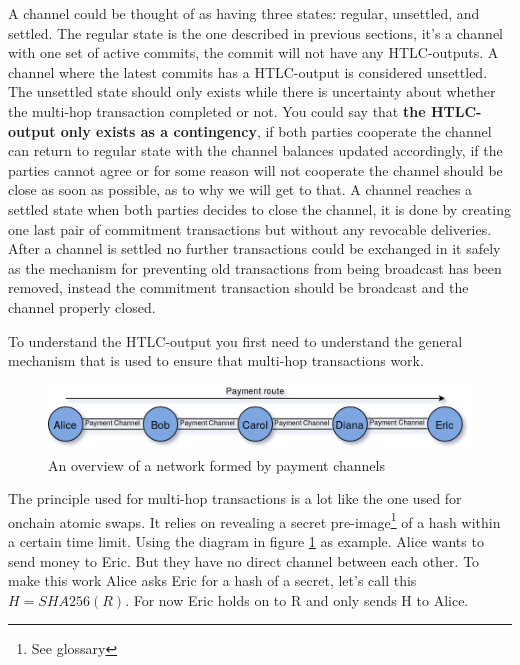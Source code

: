 A channel could be thought of as having three states: regular, unsettled, and settled. The regular state is the one described in previous sections, it's a channel with one set of active commits, the commit will not have any HTLC-outputs.\cite{lightningnetwork_2019} A channel where the latest commits has a HTLC-output is considered unsettled. The unsettled state should only exists while there is uncertainty about whether the multi-hop transaction completed or not. You could say that \textbf{the HTLC-output only exists as a contingency}, if both parties cooperate the channel can return to regular state with the channel balances updated accordingly, if the parties cannot agree or for some reason will not cooperate the channel should be close as soon as possible, as to why we will get to that.\cite{lightningnetwork_2019} A channel reaches a settled state when both parties decides to close the channel, it is done by creating one last pair of commitment transactions but without any revocable deliveries. After a channel is settled no further transactions could be exchanged in it safely as the mechanism for preventing old transactions from being broadcast has been removed, instead the commitment transaction should be broadcast and the channel properly closed.\cite{lightningnetwork_2019}\cite{bolt}

To understand the HTLC-output you first need to understand the general mechanism that is used to ensure that multi-hop transactions work. 

\begin{figure}[H]
	\centering
	\includegraphics[width=1\textwidth]{background/images/ln_route.png}
	\caption{An overview of a network formed by payment channels}
	\label{fig:pc-route}
\end{figure}

The principle used for multi-hop transactions is a lot like the one used for onchain atomic swaps. It relies on revealing a secret pre-image\footnote{See glossary} of a hash within a certain time limit. Using the diagram in figure \ref{fig:pc-route} as example. Alice wants to send money to Eric. But they have no direct channel between each other. To make this work Alice asks Eric for a hash of a secret, let's call this $H = SHA256(R)$. For now Eric holds on to R and only sends H to Alice.

